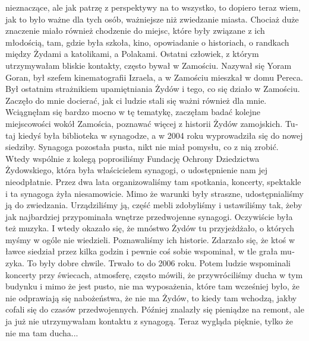 \begin{otherlanguage}{ngerman}
nieznaczące, ale jak patrzę z perspektywy na to wszystko, to dopiero teraz wiem, jak to było ważne dla tych osób, ważniejsze niż zwiedzanie miasta. Chociaż duże znaczenie miało również chodzenie do miejsc, które były związane z ich młodością, tam, gdzie była szkoła, kino, opowiadanie o historiach, o randkach między Żydami a katolikami, a Polakami. Ostatni człowiek, z którym utrzymywałam bliskie kontakty, często bywał w Zamościu. Nazywał się Yoram Goran, był szefem kinematografii Izraela, a w Zamościu mieszkał w domu Pereca. Był ostatnim strażnikiem upamiętniania Żydów i tego, co się działo w Zamościu. Zaczęło do mnie docierać, jak ci ludzie stali się ważni również dla mnie. Wciągnęłam się bardzo mocno w tę tematykę, zaczęłam badać kolejne miejscowości wokół Zamościa, poznawać więcej z historii Żydów zamojskich. Tutaj kiedyś była biblioteka w synagodze, a w 2004 roku wyprowadziła się do nowej siedziby. Synagoga pozostała pusta, nikt nie miał pomysłu, co z nią zrobić. Wtedy wspólnie z kolegą poprosiliśmy Fundację Ochrony Dziedzictwa Żydowskiego, która była właścicielem synagogi, o udostępnienie nam jej nieodpłatnie. Przez dwa lata organizowaliśmy tam spotkania, koncerty, spektakle i ta synagoga żyła niesamowicie. Mimo że warunki były straszne, udostępnialiśmy ją do zwiedzania. Urządziliśmy ją, część mebli zdobyliśmy i ustawiliśmy tak, żeby jak najbardziej przypominała wnętrze przedwojenne synagogi. Oczywiście była też muzyka. I wtedy okazało się, że mnóstwo Żydów tu przyjeżdżało, o których myśmy w ogóle nie wiedzieli. Poznawaliśmy ich historie. Zdarzało się, że ktoś w ławce siedział przez kilka godzin i pewnie coś sobie wspominał, w tle grała muzyka. To były dobre chwile. Trwało to do 2006 roku. Potem ludzie wspominali koncerty przy świecach, atmosferę, często mówili, że przywróciliśmy ducha w tym budynku i mimo że jest pusto, nie ma wyposażenia, które tam wcześniej było, że nie odprawiają się nabożeństwa, że nie ma Żydów, to kiedy tam wchodzą, jakby cofali się do czasów przedwojennych. Później znalazły się pieniądze na remont, ale ja już nie utrzymywałam kontaktu z synagogą. Teraz wygląda pięknie, tylko że nie ma tam ducha...\\

\end{otherlanguage}
